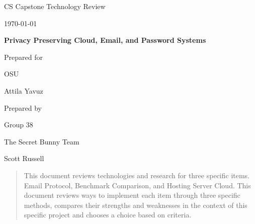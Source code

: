 \documentclass[onecolumn, draftclsnofoot,10pt, compsoc]{IEEEtran}
\def \CapstoneTeamName{		The Secret Bunny Team}
\def \CapstoneTeamNumber{		38}
\def \GroupMemberOne{			Scott Russell}
\def \GroupMemberTwo{			Scott Merrill}
\def \GroupMemberThree{			Andrew Ekstedt}
\def \CapstoneProjectName{		Privacy Preserving Cloud, Email, and Password Systems}
\def \CapstoneSponsorCompany{	OSU}
\def \CapstoneSponsorPerson{		Attila Yavuz}
\def \DocType{	%
				Technology Review
				}
\newcommand{\NameSigPair}[1]{\par
\makebox[2.75in][r]{#1} \hfil 	\makebox[3.25in]{\makebox[2.25in]{\hrulefill} \hfill		\makebox[.75in]{\hrulefill}}
\par\vspace{-12pt} \textit{\tiny\noindent
\makebox[2.75in]{} \hfil		\makebox[3.25in]{\makebox[2.25in][r]{Signature} \hfill	\makebox[.75in][r]{Date}}}}
\renewcommand{\NameSigPair}[1]{#1}
\begin{document}
\begin{titlepage}
    \begin{singlespace}
        \hfill 
        \par\vspace{.2in}
        \centering
        \scshape{
            \huge CS Capstone \DocType \par
            {\large\today}\par
            \vspace{.5in}
            \textbf{\Huge\CapstoneProjectName}\par
            \vfill
            {\large Prepared for}\par
            \Huge \CapstoneSponsorCompany\par
            \vspace{5pt}
            {\Large\NameSigPair{\CapstoneSponsorPerson}\par}
            {\large Prepared by }\par
            Group\CapstoneTeamNumber\par
            \CapstoneTeamName\par 
            \vspace{5pt}
            {\Large
                \NameSigPair{\GroupMemberOne}\par
            }
            \vspace{20pt}
        }
        \begin{abstract}
        	
            This document reviews technologies and research for three specific items. Email Protocol, Benchmark Comparison, and Hosting Server Cloud. This document reviews ways to implement each item through three specific methods, compares their strengths and weaknesses in the context of this specific project and chooses a choice based on criteria.
            
        \end{abstract}     
    \end{singlespace}
\end{titlepage}
\newpage
{}
\tableofcontents
\clearpage
\end{document}
